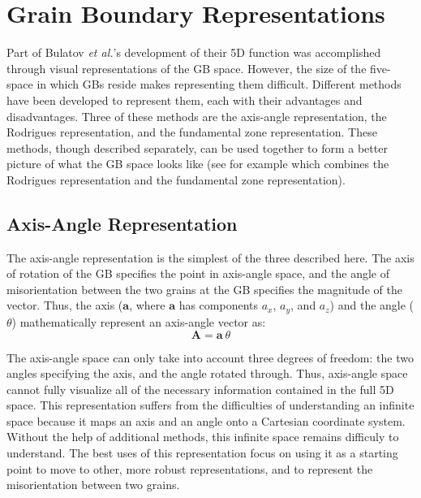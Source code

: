 \documentclass[12pt]{report}
\begin{document}
\chapter{Grain Boundary Representations\label{app:gbRep}}
Part of Bulatov \emph{et al.}'s development of their 5D function was accomplished through visual representations of the GB space.  However, the size of the five-space in which GBs reside makes representing them difficult.  Different methods have been developed to represent them, each with their advantages and disadvantages.  Three of these methods are the axis-angle representation, the Rodrigues representation, and the fundamental zone representation.  These methods, though described separately, can be used together to form a better picture of what the GB space looks like (see for example  which combines the Rodrigues representation and the fundamental zone representation).

\section{Axis-Angle Representation\label{GBReps:AA}}
The axis-angle representation is the simplest of the three described here.  The axis of rotation of the GB specifies the point in axis-angle space, and the angle of misorientation between the two grains at the GB specifies the magnitude of the vector.  Thus, the axis ($\bm{a}$, where $\bm{a}$ has components $a_x$, $a_y$, and $a_z$) and the angle ($\theta$) mathematically represent an axis-angle vector as:
\begin{equation}
\bm{A} = \bm{a}\ \theta
\label{eq:aaVec}
\end{equation} 

The axis-angle space can only take into account three degrees of freedom: the two angles specifying the axis, and the angle rotated through.  Thus, axis-angle space cannot fully visualize all of the necessary information contained in the full 5D space.\cite{frank1988} This representation suffers from the difficulties of understanding an infinite space because it maps an axis and an angle onto a Cartesian coordinate system.  Without the help of additional methods, this infinite space remains difficuly to understand.  The best uses of this representation focus on using it as a starting point to move to other, more robust representations, and to represent the misorientation between two grains.\cite{randle2000}
\end{document}
